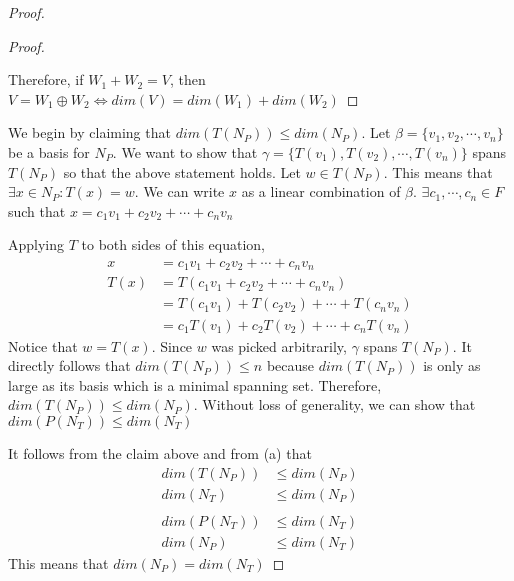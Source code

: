 \documentclass[11pt]{scrartcl}
\begin{document}
\begin{enumerate}[label=\alph*.]
{\begin{proof}
\begin{lemma}
\begin{proof}
\begin{enumerate}[label=\roman*.]
				      \end{enumerate}
				      Therefore, if $W_1 + W_2 = V$, then $V = W_1 \oplus W_2 \Leftrightarrow dim(V) = dim(W_1) + dim(W_2)$
			      \end{proof}
		      \end{lemma}
		      We begin by claiming that $dim(T(N_P)) \leq dim(N_P)$. Let $\beta = \{v_1, v_2, \cdots, v_n\}$
		      be a basis for $N_P$. We want to show that $\gamma = \{T(v_1), T(v_2), \cdots, T(v_n)\}$
		      spans $T(N_P)$ so that the above statement holds. Let $w \in T(N_P)$. This means that
		      $\exists x \in N_P : T(x) = w$. We can write $x$ as a linear combination of $\beta$.
		      $\exists c_1, \cdots, c_n \in F$ such that $x = c_1v_1 + c_2v_2 + \cdots + c_nv_n$ \par
		      Applying $T$ to both sides of this equation,
		      \begin{align*}
			      x    & = c_1v_1 + c_2v_2 + \cdots + c_nv_n          \\
			      T(x) & = T(c_1v_1 + c_2v_2 + \cdots + c_nv_n)       \\
			           & = T(c_1v_1) + T(c_2v_2) + \cdots + T(c_nv_n) \\
			           & = c_1T(v_1) + c_2T(v_2) + \cdots + c_nT(v_n)
		      \end{align*}
		      Notice that $w = T(x)$. Since $w$ was picked arbitrarily, $\gamma$ spans $T(N_P)$. It directly
		      follows that $dim(T(N_P)) \leq n$ because $dim(T(N_P))$ is only as large as its basis which is a minimal
		      spanning set. Therefore, $dim(T(N_P)) \leq dim(N_P)$. Without loss of generality, we can show that
		      $dim(P(N_T)) \leq dim(N_T)$ \par
		      It follows from the claim above and from (a) that
		      \begin{align*}
			      dim(T(N_P)) & \leq dim(N_P) \\
			      dim(N_T)    & \leq dim(N_P) \\
			                  &               \\
			      dim(P(N_T)) & \leq dim(N_T) \\
			      dim(N_P)    & \leq dim(N_T)
		      \end{align*}
		      This means that $dim(N_P) = dim(N_T)$ \par


\end{proof}}
\end{enumerate}
\end{document}
